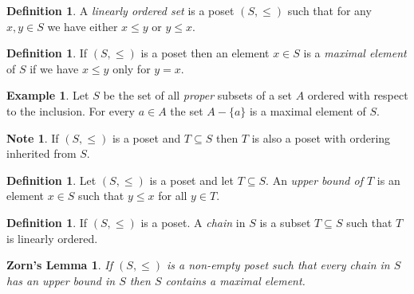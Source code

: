 \documentclass[12pt, letterpaper, oneside]{article}
\theoremstyle{plain}
\newtheorem{ZL}[theorem]{Zorn's Lemma}
\theoremstyle{definition}
\newtheorem{definition}[theorem]{Definition}
\newtheorem{example}[theorem]{Example}
\newtheorem{note}[theorem]{Note}
\newcommand{\vs}{\vskip 5mm}
\begin{document}
\vs\vs

\begin{definition}
A \emph{linearly ordered set} is a poset $(S, \leq)$ such that for any $x, y\in S$ we have 
either $x\leq y$ or $y\leq x$.
\end{definition}


\vs\vs

\begin{definition}
If $(S, \leq)$ is a poset then an element $x\in S$ is a \emph{maximal element} of $S$
if  we have $x\leq y$ only for $y= x$.
\end{definition}

\vs\vs

\begin{example}
Let $S$ be the set of all \emph{proper} subsets of a set $A$ ordered with respect to the inclusion. 
For every $a\in A$ the set $A-\{a\}$ is a maximal element of $S$.
\end{example}

\vs\vs


\vs\vs

\begin{note}
If $(S, \leq)$ is a poset and $T\subseteq S$ then $T$ is also a poset with ordering inherited from 
$S$. 
\end{note}


\vs

\begin{definition}
Let $(S, \leq)$ is a poset and let  $T\subseteq S$. An \emph{upper bound of $T$} is an element 
$x\in S$ such that  $y\leq x$ for all $y\in T$.  
\end{definition}

\vs\vs

\begin{definition}
If $(S, \leq)$ is a poset. A \emph{chain} in $S$ is a subset  $T\subseteq S$ such that 
$T$ is linearly ordered.   
\end{definition}


\vs\vs

\begin{ZL}
\label{LEMMA_ZL}
If $(S, \leq)$ is a non-empty poset such that every chain in $S$ has an upper bound in $S$
then $S$ contains a maximal element.  
\end{ZL}

\vs\vs
\end{document}
